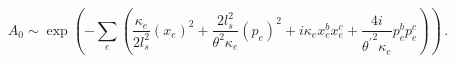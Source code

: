 \begin{equation}
A_{0}\sim \exp \left( -\sum_{e}\left( \frac{\kappa _{e}}{2l_{s}^{2}}%
(x_{e})^{2}+\frac{2l_{s}^{2}}{\theta ^{2}\kappa _{e}}(p_{e})^{2}+i\kappa
_{e}x_{e}^{b}x_{e}^{c}+\frac{4i}{{\theta ^{\prime }}^{2}\kappa _{e}}%
p_{e}^{b}p_{e}^{c}\right) \right) \,.  \label{butterfly}
\end{equation}%
